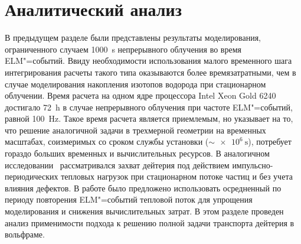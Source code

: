 \section{Аналитический анализ}\label{sec:ch3/sec3}

В предыдущем разделе были представлены результаты моделирования, ограниченного случаем \SI{1000}{\second} непрерывного облучения во время ELM"=событий. Ввиду необходимости использования малого временного шага интегрирования расчеты такого типа оказываются более времязатратными, чем в случае моделирования накопления изотопов водорода при стационарном облучении. Время расчета на одном ядре процессора Intel Xeon Gold 6240 достигало \SI{72}{\hour} в случае непрерывного облучения при частоте ELM"=событий, равной \SI{100}{\hertz}. Такое время расчета является приемлемым, но указывает на то, что решение аналогичной задачи в трехмерной геометрии на временных масштабах, соизмеримых со сроком службы установки (\( \sim \SI{e6}{\second}\)), потребует гораздо больших временных и вычислительных ресурсов. В аналогичном исследовании~\cite{Dasgupta2023} рассматривался захват дейтерия под действием импульсно-периодических тепловых нагрузок при стационарном потоке частиц и без учета влияния дефектов. В работе было предложено использовать осредненный по периоду повторения ELM"=событий тепловой поток для упрощения моделирования и снижения вычислительных затрат. В этом разделе проведен анализ применимости подхода к решению полной задачи транспорта дейтерия в вольфраме.

